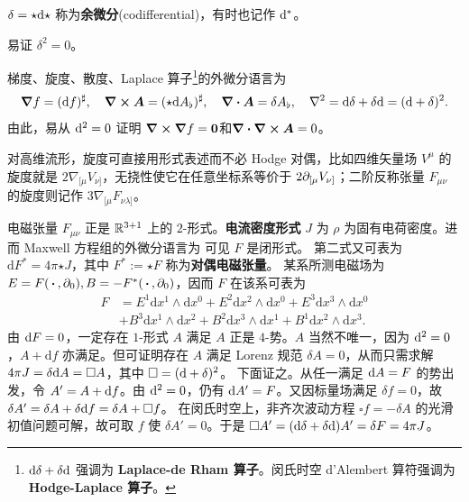 \begin{definition}
    $\delta={\star\dd\star}$ 称为\textbf{余微分}(codifferential)，有时也记作 $\dd^*$。
\end{definition}
\begin{theorem}
    易证 $\delta^2=0$。
\end{theorem}

\begin{example}[矢量分析]
    梯度、旋度、散度、Laplace 算子\footnote{$\dd \delta+\delta \dd$ 强调为 \textbf{Laplace-de Rham 算子}。闵氏时空 d'Alembert 算符强调为 \textbf{Hodge-Laplace 算子}。}的外微分语言为
    \[\grad f=(\dd f)^\sharp,\quad
    \curl\bm A=({\star\dd} A_\flat)^\sharp,\quad
    \div\bm A=\delta A_\flat,\quad
    \nabla^2=\dd \delta+\delta \dd=(\dd+\delta)^2.\]
    由此，易从 $\dd^2=0$ 证明 $\curl\grad f=\bm 0$和$\div\curl\bm A=0$。
    
    对高维流形，旋度可直接用形式表述而不必 Hodge 对偶，比如四维矢量场 $V^\mu$ 的旋度就是 $2\nabla_{[\mu} V_{\nu]}$，无挠性使它在任意坐标系等价于 $2\partial_{[\mu} V_{\nu]}$；二阶反称张量 $F_{\mu\nu}$ 的旋度则记作 $3\nabla_{[\mu}F_{\nu\lambda]}$。
\end{example}

\begin{example}
    电磁张量 $F_{\mu\nu}$ 正是 $\mathbb{R}^{3+1}$ 上的 $2$-形式。\textbf{电流密度形式} $J$ 为
$\rho$ 为固有电荷密度。进而 Maxwell 方程组的外微分语言为
可见 $F$ 是闭形式。
第二式又可表为 $\mathrm{d}F^*=4\pi{\star J}$，其中 $F^*:={\star}F$ 称为\textbf{对偶电磁张量}。
某系所测电磁场为 $E=F(\oo,\p_0),B=-F^*(\oo,\p_0)$，因而 $F$ 在该系可表为
\begin{align*}F&= E^{1} \mathrm{d} x^{1} \wedge \mathrm{d} x^{0}+E^{2} \mathrm{d} x^{2} \wedge \mathrm{d} x^{0}+E^{3} \mathrm{d} x^{3} \wedge \mathrm{d} x^{0} \\&+ B^{3} \mathrm{d} x^{1} \wedge \mathrm{d} x^{2}+B^{2} \mathrm{d} x^{3} \wedge \mathrm{d} x^{1}+B^{1} \mathrm{d} x^{2} \wedge \mathrm{d} x^{3}.\end{align*}
由 $\dd F=0$，一定存在 $1$-形式 $A$ 满足
$A$ 正是 $4$-势。$A$ 当然不唯一，因为 $\dd^{2}=0$，$A+\mathrm{d} f$ 亦满足。但可证明存在 $A$ 满足 Lorenz 规范 $\delta A=0$，从而只需求解 $4\pi J=\delta\dd A=\square A$，其中 $\square=(\dd+\delta)^2$。
下面证之。从任一满足 $\dd A=F$ 的势出发，令 $A'=A+\dd f$。由 $\dd^2=0$，仍有 $\dd A'=F$。又因标量场满足 $\delta f=0$，故 $\delta A'=\delta A+\delta\dd f=\delta A+\square f$。
在闵氏时空上，非齐次波动方程 $\square f=-\delta A$ 的光滑初值问题可解，故可取 $f$ 使 $\delta A'=0$。于是 $\square A'=(\dd\delta+\delta\dd)A'=\delta F=4\pi J$。
\end{example}


